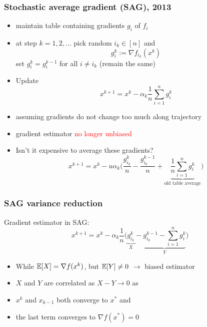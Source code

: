 \documentclass{beamer}
\begin{document}
\begin{frame}
  \frametitle{Stochastic average gradient (SAG), 2013}
  \begin{itemize}
    \item maintain table containing gradients $g_i$ of $f_i$
    \item at step $k = 1,2, \dots$ pick random $i_k \in [n]$ and
          \begin{equation}
            g_i^k := \nabla f_{i_k}(x^{k})
          \end{equation}
          set $g_{i}^k = g_i^{k-1}$ for all $i\neq i_k$ (remain the same)
    \item Update
          \begin{equation}
            x^{k+1} = x^k - \alpha_k \frac{1}{n} \sum_{i=1}^{n} g_i^k
          \end{equation}
    \item assuming gradients do not change too much along trajectory
    \item gradient estimator \textcolor{red}{no longer unbiased}
    \item Isn't it expensive to average these gradients?
          \begin{equation}
            x^{k+1} = x^k -u \alpha_k  \Big( \frac{g_{i_k}^k}{n} - \frac{g_{i_k}^{k-1}}{n} + \underbrace{\frac{1}{n}\sum_{i=1}^{n} g_i^k}_{\text{old table average}} \Big)
          \end{equation}
  \end{itemize}
\end{frame}


\begin{frame}
  \frametitle{SAG variance reduction}
  Gradient estimator in SAG:
  \begin{equation}
    x^{k+1} = x^k - \alpha_k \frac{1}{n} \Big( \underbrace{g_{i_k}^k}_X - \underbrace{g_{i_k}^{k-1} - \sum_{i=1}^{n} g_i^k}_{Y} \Big)
  \end{equation}
  \begin{itemize}
    \item While $\mathbb{E}[X] = \nabla f(x^k)$, but $\mathbb{E}[Y]\neq 0$ $\rightarrow $ biased estimator
    \item $X$ and $Y$ are correlated as $X-Y \to 0$  as
    \item $x^k$ and $x_{k-1}$ both converge to $x^*$ and
    \item the last term converges to $\nabla f(x^*)= 0$
  \end{itemize}
\end{frame}
\end{document}
